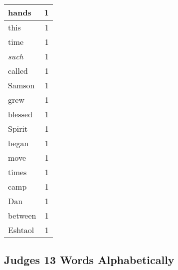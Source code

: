 \begin{center}
\begin{longtable}{l|r}
hands & 1\\ \hline 
this & 1\\ \hline 
time & 1\\ \hline 
\emph{such} & 1\\ \hline 
called & 1\\ \hline 
Samson & 1\\ \hline 
grew & 1\\ \hline 
blessed & 1\\ \hline 
Spirit & 1\\ \hline 
began & 1\\ \hline 
move & 1\\ \hline 
times & 1\\ \hline 
camp & 1\\ \hline 
Dan & 1\\ \hline 
between & 1\\ \hline 
Eshtaol & 1\\ \hline 
\end{longtable}
\end{center}





\subsection{Judges 13 Words Alphabetically}


\normalsize
 
